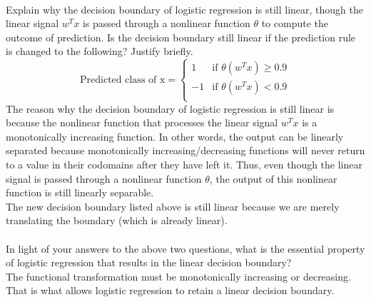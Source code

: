 \documentclass[12pt]{article}
\begin{document}
	\\ 
	Explain why the decision boundary of logistic regression is still linear, though the linear signal $w^Tx$ is passed through a nonlinear function $\theta$ to compute the outcome of prediction.
	Is the decision boundary still linear if the prediction rule is changed to the following? Justify briefly.
	\begin{equation*}
	\text{Predicted class of x} = 
	\begin{cases}
	1 & \text{if } \theta(w^Tx) \ge 0.9 \\
	-1 & \text{if } \theta(w^Tx) < 0.9 \\
	\end{cases}
	\end{equation*}
	The reason why the decision boundary of logistic regression is still linear is because the nonlinear function that processes the linear signal $w^T x$ is a monotonically increasing function. In other words, the output can be linearly separated because monotonically increasing/decreasing functions will never return to a value in their codomains after they have left it. Thus, even though the linear signal is passed through a nonlinear function $\theta$, the output of this nonlinear function is still linearly separable. \\
	The new decision boundary listed above is still linear because we are merely translating the boundary (which is already linear).
	\\ \\
	In light of your answers to the above two questions, what is the essential property of logistic regression that results in the linear decision boundary? \\
	The functional transformation must be monotonically increasing or decreasing. That is what allows logistic regression to retain a linear decision boundary.
	
	
	
	
\end{document}
